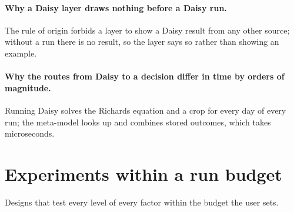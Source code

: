 \paragraph{Why a Daisy layer draws nothing before a Daisy run.} The rule of origin forbids a layer to show a Daisy result from any other source; without a run there is no result, so the layer says so rather than showing an example.

\paragraph{Why the routes from Daisy to a decision differ in time by orders of magnitude.} Running Daisy solves the Richards equation and a crop for every day of every run; the meta-model looks up and combines stored outcomes, which takes microseconds.


\section{Experiments within a run budget}
Designs that test every level of every factor within the budget the user sets.

